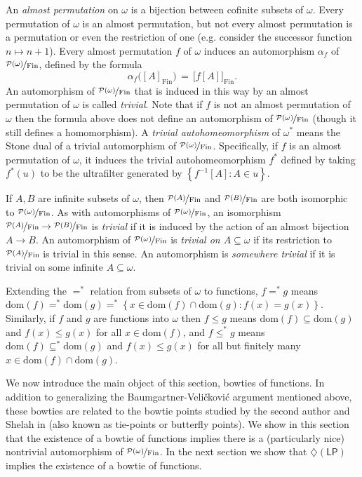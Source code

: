 \documentclass[11pt,leqno]{amsart}
\theoremstyle{definition}
\theoremstyle{remark}
\renewcommand{\P}{\mathcal{P}}
\newcommand{\explicitSet}[1]{\left\lbrace #1 \right\rbrace}
\newcommand{\set}[2]{\explicitSet{#1 \colon #2}}
\newcommand{\<}{\langle}
\renewcommand{\>}{\rangle}
\newcommand{\w}{\omega}
\newcommand{\0}{\emptyset}
\newcommand{\sub}{\subseteq}
\newcommand{\1}{1\hspace{-1.75mm}1}
\newcommand{\pwmf}{\nicefrac{\mathcal{P}(\w)}{\mathrm{Fin}}}
\newcommand{\dLP}{\diamondsuit(\mathsf{LP})}
\begin{document}
An \emph{almost permutation} on $\w$ is a bijection between cofinite subsets of $\w$. 
Every permutation of $\w$ is an almost permutation, but not every almost permutation is a permutation or even the restriction of one (e.g. consider the successor function $n \mapsto n+1$). 
Every almost permutation $f$ of $\w$ induces an automorphism $\alpha_f$ of $\pwmf$, defined by the formula 
$$\alpha_f \big( [A]_{\mathrm{Fin}} \big) \,=\, \big[ f[A] \big]_{\mathrm{Fin}}.$$ 
An automorphism of $\pwmf$ that is induced in this way by an almost permutation of $\w$ is called \emph{trivial}. 
Note that if $f$ is not an almost permutation of $\w$ then the formula above does not define an automorphism of $\pwmf$ (though it still defines a homomorphism). 
A \emph{trivial autohomeomorphism} of $\w^*$ means the Stone dual of a trivial automorphism of $\pwmf$. Specifically, if $f$ is an almost permutation of $\w$, it induces the trivial autohomeomorphism $f^*$ defined by taking 
$f^*(u)$ to be the ultrafilter generated by $\set{f^{-1}[A]}{A \in u}$. 

If $A,B$ are infinite subsets of $\w$, then $\nicefrac{\P(A)}{\mathrm{Fin}}$ and $\nicefrac{\P(B)}{\mathrm{Fin}}$ are both isomorphic to $\pwmf$. 
As with automorphisms of $\pwmf$, an isomorphism $\nicefrac{\P(A)}{\mathrm{Fin}} \to \nicefrac{\P(B)}{\mathrm{Fin}}$ is \emph{trivial} if it is induced by the action of an almost bijection $A \to B$. 
An automorphism of $\pwmf$ is \emph{trivial on $A \sub \w$} if its restriction to $\nicefrac{\P(A)}{\mathrm{Fin}}$ is trivial in this sense. 
An automorphism is \emph{somewhere trivial} if it is trivial on some infinite $A \sub \w$. 

Extending the $=^*$ relation from subsets of $\w$ to functions, 
$f =^* g$ means $\mathrm{dom}(f) =^* \mathrm{dom}(g) =^* \set{x \in \mathrm{dom}(f) \cap \mathrm{dom}(g)}{f(x)=g(x)}$. 
Similarly, if $f$ and $g$ are functions into $\w$ then 
$f \leq g$ means $\mathrm{dom}(f) \sub \mathrm{dom}(g)$ and $f(x) \leq g(x)$ for all $x \in \mathrm{dom}(f)$, and 
$f \leq^* g$ means $\mathrm{dom}(f) \sub^* \mathrm{dom}(g)$ and $f(x) \leq g(x)$ for all but finitely many $x \in \mathrm{dom}(f) \cap \mathrm{dom}(g)$. 

We now introduce the main object of this section, bowties of functions. In addition to generalizing the Baumgartner-Veli\v{c}kovi\'c argument mentioned above, these bowties are related to the bowtie points studied by the second author and Shelah in \cite{DS2} (also known as tie-points or butterfly points). We show in this section that the existence of a bowtie of functions implies there is a (particularly nice) nontrivial automorphism of $\pwmf$. In the next section we show that $\dLP$ implies the existence of a bowtie of functions. 
\end{document}
